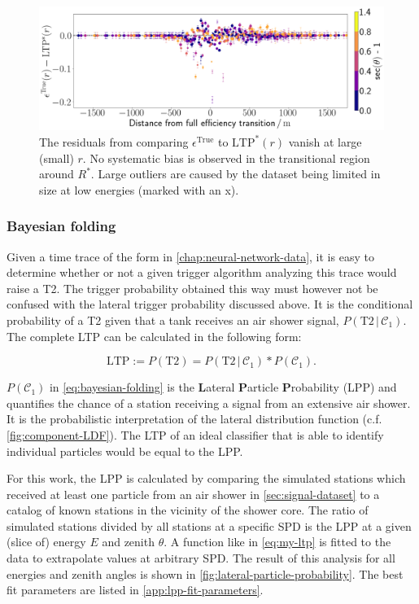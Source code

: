 \begin{figure}
	\centering
	\includegraphics[width=1\textwidth]{./plots/LTP_bias_check.png}
	\caption{The residuals from comparing $\epsilon^\text{True}$ to $\text{LTP}^*(r)$ vanish at large (small) $r$. No systematic bias is observed in the 
	transitional region around $R^*$. Large outliers are caused by the dataset being limited in size at low energies (marked with an x).}
	\label{fig:fitfunction-comparison}
\end{figure}

\subsubsection{Bayesian folding}
\label{sssec:bayesian-folding}

Given a time trace of the form in \autoref{chap:neural-network-data}, it is easy to determine whether or not a given trigger algorithm analyzing this trace would
raise a T2. The trigger probability obtained this way must however not be confused with the lateral trigger probability discussed above. It is the conditional 
probability of a T2 given that a tank receives an air shower signal, $P(\text{T2}\,|\,\mathcal{C}_1)$. The complete LTP can be calculated in the following form:

\begin{equation}
	\label{eq:bayesian-folding}
	\text{LTP} := P(\text{T2}) = P(\text{T2}\,|\,\mathcal{C}_1) * P(\mathcal{C}_1).
\end{equation}

$P(\mathcal{C}_1)$ in \autoref{eq:bayesian-folding} is the \textbf{L}ateral \textbf{P}article \textbf{P}robability (LPP) and quantifies the chance of a station 
receiving a signal from an extensive air shower. It is the probabilistic interpretation of the lateral distribution function (c.f. \autoref{fig:component-LDF}). 
The LTP of an ideal classifier that is able to identify individual particles would be equal to the LPP.

For this work, the LPP is calculated by comparing the simulated stations which received at least one particle from an air shower in \autoref{sec:signal-dataset} to
a catalog of known stations in the vicinity of the shower core. The ratio of simulated stations divided by all stations at a specific SPD is the LPP at a given 
(slice of) energy $E$ and zenith $\theta$. A function like in \autoref{eq:my-ltp} is fitted to the data to extrapolate values at arbitrary SPD. The result of this 
analysis for all energies and zenith angles is shown in \autoref{fig:lateral-particle-probability}. The best fit parameters are listed in 
\autoref{app:lpp-fit-parameters}.

